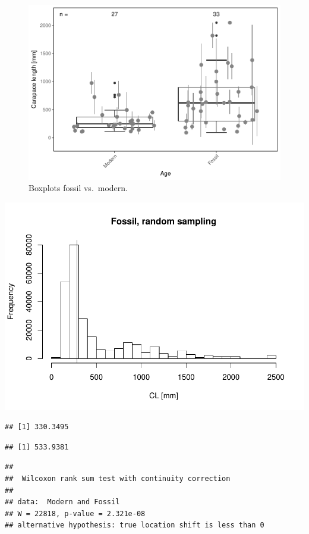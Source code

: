 \documentclass[]{article}
\begin{document}
\begin{figure}[htbp]
\centering
\includegraphics{MA_JJ_files/figure-latex/BPMF-1.pdf}
\caption{Boxplots fossil vs.~modern.}
\end{figure}

\includegraphics{MA_JJ_files/figure-latex/RSFM-1.pdf}

\begin{verbatim}
## [1] 330.3495
\end{verbatim}

\begin{verbatim}
## [1] 533.9381
\end{verbatim}

\begin{verbatim}
## 
##  Wilcoxon rank sum test with continuity correction
## 
## data:  Modern and Fossil
## W = 22818, p-value = 2.321e-08
## alternative hypothesis: true location shift is less than 0
\end{verbatim}
\end{document}
